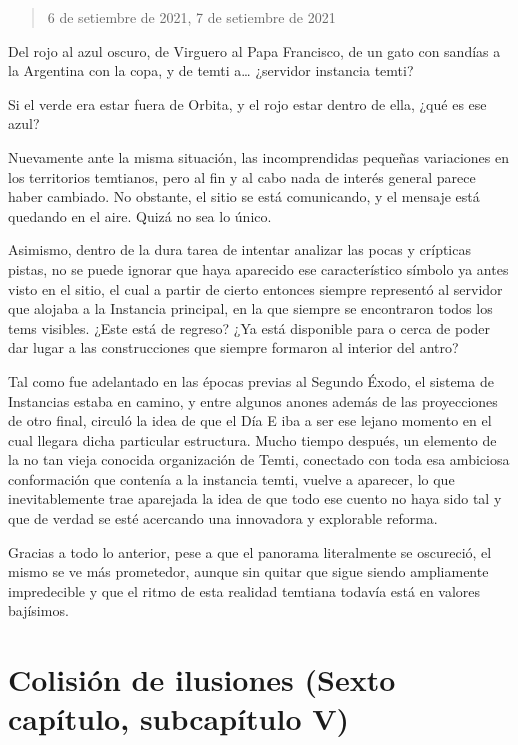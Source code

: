 \documentclass[
  spanish,
]{book}
\begin{document}
\begin{quote}
6 de setiembre de 2021, 7 de setiembre de 2021
\end{quote}

Del rojo al azul oscuro, de Virguero al Papa Francisco, de un gato con sandías a la Argentina con la copa, y de temti a\ldots{} ¿servidor instancia temti?

Si el verde era estar fuera de Orbita, y el rojo estar dentro de ella, ¿qué es ese azul?

Nuevamente ante la misma situación, las incomprendidas pequeñas variaciones en los territorios temtianos, pero al fin y al cabo nada de interés general parece haber cambiado. No obstante, el sitio se está comunicando, y el mensaje está quedando en el aire. Quizá no sea lo único.

Asimismo, dentro de la dura tarea de intentar analizar las pocas y crípticas pistas, no se puede ignorar que haya aparecido ese característico símbolo ya antes visto en el sitio, el cual a partir de cierto entonces siempre representó al servidor que alojaba a la Instancia principal, en la que siempre se encontraron todos los tems visibles. ¿Este está de regreso? ¿Ya está disponible para o cerca de poder dar lugar a las construcciones que siempre formaron al interior del antro?

Tal como fue adelantado en las épocas previas al Segundo Éxodo, el sistema de Instancias estaba en camino, y entre algunos anones además de las proyecciones de otro final, circuló la idea de que el Día E iba a ser ese lejano momento en el cual llegara dicha particular estructura. Mucho tiempo después, un elemento de la no tan vieja conocida organización de Temti, conectado con toda esa ambiciosa conformación que contenía a la instancia temti, vuelve a aparecer, lo que inevitablemente trae aparejada la idea de que todo ese cuento no haya sido tal y que de verdad se esté acercando una innovadora y explorable reforma.

Gracias a todo lo anterior, pese a que el panorama literalmente se oscureció, el mismo se ve más prometedor, aunque sin quitar que sigue siendo ampliamente impredecible y que el ritmo de esta realidad temtiana todavía está en valores bajísimos.

\hypertarget{colisiuxf3n-de-ilusiones-sexto-capuxedtulo-subcapuxedtulo-v}{%
\section{Colisión de ilusiones (Sexto capítulo, subcapítulo V)}\label{colisiuxf3n-de-ilusiones-sexto-capuxedtulo-subcapuxedtulo-v}}
\end{document}
